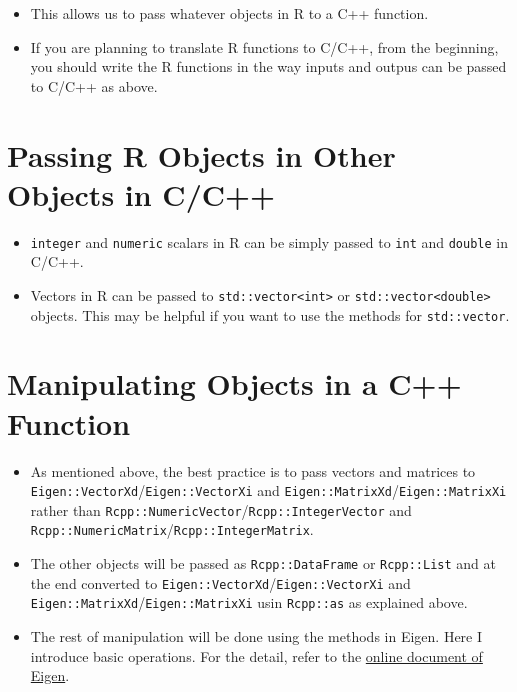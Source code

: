 \documentclass[
]{book}
\providecommand{\tightlist}{%
  \setlength{\itemsep}{0pt}\setlength{\parskip}{0pt}}
\begin{document}
\begin{itemize}
\tightlist
\item
  This allows us to pass whatever objects in R to a C++ function.
\item
  If you are planning to translate R functions to C/C++, from the beginning, you should write the R functions in the way inputs and outpus can be passed to C/C++ as above.
\end{itemize}

\hypertarget{passing-r-objects-in-other-objects-in-cc}{%
\section{Passing R Objects in Other Objects in C/C++}\label{passing-r-objects-in-other-objects-in-cc}}

\begin{itemize}
\tightlist
\item
  \texttt{integer} and \texttt{numeric} scalars in R can be simply passed to \texttt{int} and \texttt{double} in C/C++.
\item
  Vectors in R can be passed to \texttt{std::vector\textless{}int\textgreater{}} or \texttt{std::vector\textless{}double\textgreater{}} objects. This may be helpful if you want to use the methods for \texttt{std::vector}.
\end{itemize}

\hypertarget{manipulating-objects-in-a-c-function}{%
\section{Manipulating Objects in a C++ Function}\label{manipulating-objects-in-a-c-function}}

\begin{itemize}
\tightlist
\item
  As mentioned above, the best practice is to pass vectors and matrices to \texttt{Eigen::VectorXd}/\texttt{Eigen::VectorXi} and \texttt{Eigen::MatrixXd}/\texttt{Eigen::MatrixXi} rather than \texttt{Rcpp::NumericVector}/\texttt{Rcpp::IntegerVector} and \texttt{Rcpp::NumericMatrix}/\texttt{Rcpp::IntegerMatrix}.
\item
  The other objects will be passed as \texttt{Rcpp::DataFrame} or \texttt{Rcpp::List} and at the end converted to \texttt{Eigen::VectorXd}/\texttt{Eigen::VectorXi} and \texttt{Eigen::MatrixXd}/\texttt{Eigen::MatrixXi} usin \texttt{Rcpp::as} as explained above.
\item
  The rest of manipulation will be done using the methods in Eigen. Here I introduce basic operations. For the detail, refer to the \href{https://eigen.tuxfamily.org/dox/GettingStarted.html}{online document of Eigen}.
\end{itemize}
\end{document}
